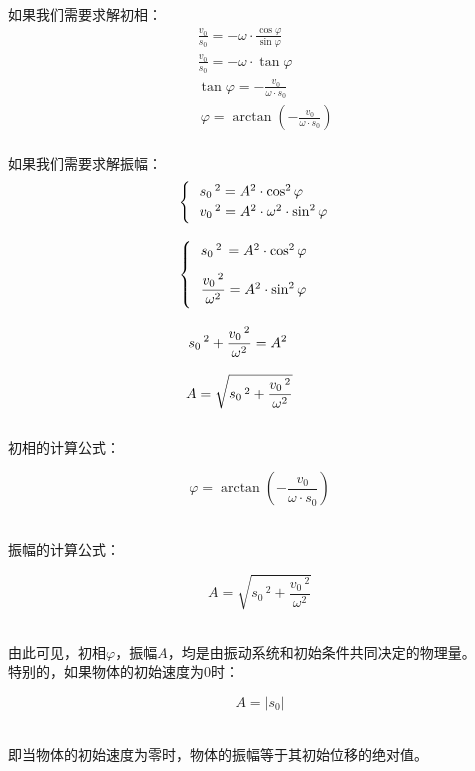 \documentclass[UTF8]{ctexart}
\begin{document}
\newpage

    如果我们需要求解初相：\vspace{5pt}
    \begin{align}
        &\frac{v_0}{s_0}=-\omega\cdot\frac{\cos{\varphi}}{\sin{\varphi}}\\[4mm]
        &\frac{v_0}{s_0}=-\omega\cdot\tan{\varphi}\\[4mm]
        &\tan{\varphi}=-\frac{v_0}{\omega\cdot s_0}\\[2mm]
        &~\varphi=\arctan{\left(-\frac{v_0}{\omega\cdot s_0}\right)}
    \end{align}\\
    如果我们需要求解振幅：\vspace{5pt}
    \begin{align}
        &\begin{cases}
            ~~s_0\,^2=A^2\cdot\cos^2{\varphi}\\
            ~~v_0\,^2=A^2\cdot\omega^2\cdot\sin^2{\varphi}\vspace{1pt}
        \end{cases}\\[3mm]
        &\begin{cases}
            ~~s_0\,^2\,=A^2\cdot\cos^2{\varphi}\\[3mm]
            ~~\dfrac{v_0\,^2}{\omega^2}=A^2\cdot\sin^2{\varphi}\vspace{4pt}
        \end{cases}\\[3mm]
        &~~\,s_0\,^2+\frac{v_0\,^2}{\omega^2}=A^2\\[3mm]
        &~~A=\sqrt{s_0\,^2+\frac{v_0\,^2}{\omega^2}}
    \end{align}\\
    初相的计算公式：
    \begin{large}
        \begin{equation*}
            \varphi=\arctan{\left(-\frac{v_0}{\omega\cdot s_0}\right)}
        \end{equation*}
    \end{large}\\
    振幅的计算公式：
    \begin{large}
        \begin{equation*}
            A=\sqrt{s_0\,^2+\frac{v_0\,^2}{\omega^2}}
        \end{equation*}
    \end{large}\\
    由此可见，初相$\varphi$，振幅$A$，均是由振动系统和初始条件共同决定的物理量。\\[5mm]
    特别的，如果物体的初始速度为$0$时：
    \begin{large}
        \begin{equation*}
            A=|s_0|
        \end{equation*}
    \end{large}\\
    即当物体的初始速度为零时，物体的振幅等于其初始位移的绝对值。
\end{document}

